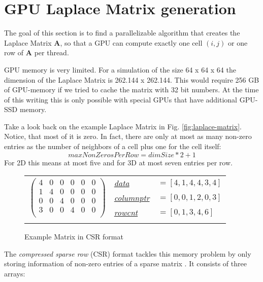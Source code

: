 \section{GPU Laplace Matrix generation}
The goal of this section is to find a parallelizable algorithm that creates the Laplace Matrix \textbf{A}, so that a GPU can compute exactly one cell $(i,j)$ or one row of \textbf{A} per thread.
\par GPU memory is very limited. For a simulation of the size 64 x 64 x 64 the dimension of the Laplace Matrix is 262.144 x 262.144. This would require 256 GB of GPU-memory if we tried to cache the matrix with 32 bit numbers. At the time of this writing this is only possible with special GPUs that have additional GPU-SSD memory.
\par Take a look back on the example Laplace Matrix in Fig. \ref{fig:laplace-matrix}. Notice, that most of it is zero. In fact, there are only at most as many non-zero entries as the number of neighbors of a cell plus one for the cell itself:
\begin{equation}
	maxNonZerosPerRow = dimSize * 2 + 1
\end{equation}
For 2D this means at most five and for 3D at most seven entries per row.
\newpage
\begin{figure*}
	\centering
	\begin{tabular}{lll}
	\multirow{3}{*}{$\left( {\begin{array}{cccccc}
   4 & 0 & 0 & 0 & 0 & 0  \\
   1 & 4 & 0 & 0 & 0 & 0  \\
   0 & 0 & 4 & 0 & 0 & 0  \\
   3 & 0 & 0 & 4 & 0 & 0  \\
  \end{array} } \right)$}
	& \hyperref[csr-data]{\textit{data}} & $=[4,1,4,4,3,4]$  \\
	& \hyperref[csr-columnptr]{\textit{columnptr}} & $=[0,0,1,2,0,3]$ \\
	& \hyperref[csr-rowcnt]{\textit{rowcnt}} & $=[0,1,3,4,6]$ \\
	& & 
	\end{tabular}
\caption{Example Matrix in CSR format}\label{fig:csr-matrix}
\end{figure*}
\par The \textit{compressed sparse row} (CSR) format tackles this memory problem by only storing information of non-zero entries of a sparse matrix \parencite{tinney1967direct}. It consists of three arrays:\\\\

